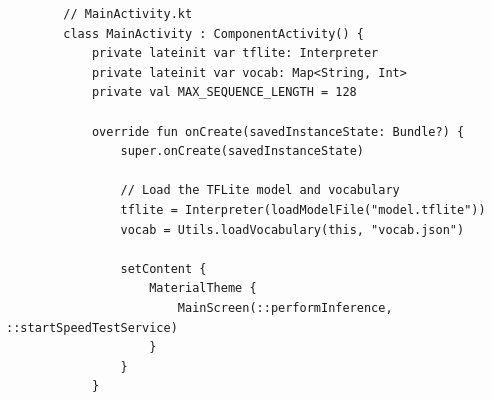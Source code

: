 \begin{listing}
    \begin{verbatim}
        // MainActivity.kt
        class MainActivity : ComponentActivity() {
            private lateinit var tflite: Interpreter
            private lateinit var vocab: Map<String, Int>
            private val MAX_SEQUENCE_LENGTH = 128
            
            override fun onCreate(savedInstanceState: Bundle?) {
                super.onCreate(savedInstanceState)
                
                // Load the TFLite model and vocabulary
                tflite = Interpreter(loadModelFile("model.tflite"))
                vocab = Utils.loadVocabulary(this, "vocab.json")
                
                setContent {
                    MaterialTheme {
                        MainScreen(::performInference, ::startSpeedTestService)
                    }
                }
            }
        \end{verbatim}
        \caption[\texttt{MainActivity.kt} (deel 1)]{Het eerste deel van \texttt{MainActivity.kt} initialiseert het -model en laadt het vocabulairebestand, met behulp van functies zoals \texttt{loadVocabulary} uit het utility-object \ref{lst:load-vocabulary}.}
        \label{lst:main-activity-part1}
    \end{listing}
    
